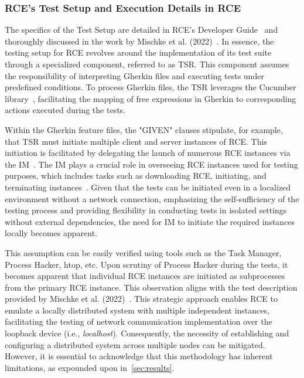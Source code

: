 \subsubsection{\ac{RCE}'s Test Setup and Execution Details in RCE}
The specifics of the Test Setup are detailed in \ac{RCE}'s Developer Guide~\cite{rceDevGuide10x} and thoroughly discussed in the work by Mischke et al. (2022)~\cite{10.1007/978-3-031-08760-8_44}. In essence, the testing setup for \ac{RCE} revolves around the implementation of its test suite through a specialized component, referred to as \acf{TSR}. This component assumes the responsibility of interpreting Gherkin files and executing tests under predefined conditions. To process Gherkin files, the \ac{TSR} leverages the Cucumber library~\cite{10.1007/978-3-031-08760-8_44}, facilitating the mapping of free expressions in Gherkin to corresponding actions executed during the tests.

Within the Gherkin feature files, the "GIVEN" clauses stipulate, for example, that \ac{TSR} must initiate multiple client and server instances of \ac{RCE}. This initiation is facilitated by delegating the launch of numerous \ac{RCE} instances via the \acf{IM}~\cite{rceDevGuide10x}. 
The \ac{IM} plays a crucial role in overseeing \ac{RCE} instances used for testing purposes, which includes tasks such as downloading \ac{RCE}, initiating, and terminating instances~\cite{10.1007/978-3-031-08760-8_44,rceDevGuide10x}. Given that the tests can be initiated even in a localized environment without a network connection, emphasizing the self-sufficiency of the testing process and providing flexibility in conducting tests in isolated settings without external dependencies, the need for \ac{IM} to initiate the required instances locally becomes apparent.

This assumption can be easily verified using tools such as the Task Manager, Process Hacker, htop, etc. Upon scrutiny of Process Hacker during the tests, it becomes apparent that individual \ac{RCE} instances are initiated as subprocesses from the primary \ac{RCE} instance. This observation aligns with the test description provided by Mischke et al. (2022)~\cite{10.1007/978-3-031-08760-8_44}. This strategic approach enables \ac{RCE} to emulate a locally distributed system with multiple independent instances, facilitating the testing of network communication implementation over the loopback device (i.e., \textit{localhost}). Consequently, the necessity of establishing and configuring a distributed system across multiple nodes can be mitigated. However, it is essential to acknowledge that this methodology has inherent limitations, as expounded upon in~\cref{sec:results}.

